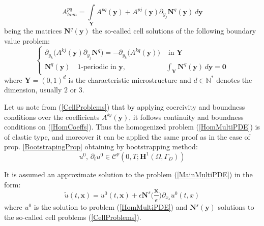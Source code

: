 \begin{equation}
    \label{HomCoeffs}
    A^{pq}_{hom} = \int \limits_{\mathbf{Y}} A^{pq}(\mathbf{y}) + A^{pj} (\mathbf{y}) \partial_{y_j} \mathbf{N}^q (\mathbf{y}) \, d\mathbf{y}
\end{equation}
being the matrices $\mathbf{N}^q(\mathbf{y})$ the so-called cell solutions of the following boundary value problem:
\begin{equation}
    \label{CellProblems}
    \left \{
    \begin{array}{cc}
        \partial_{y_k} \big( A^{kj}(\mathbf{y}) \partial_{y_j} \mathbf{N}^q \big) = -\partial_{y_k} \big( A^{kq}(\mathbf{y}) \big) & \text{ in } \mathbf{Y} \\
        \mathbf{N}^q(\mathbf{y}) \quad 1\text{-periodic in } \mathbf{y}, & \int_{\mathbf{Y}}  \mathbf{N}^q (\mathbf{y}) \, d\mathbf{y} = \mathbf{0}
    \end{array}
    \right .
\end{equation}
where $\mathbf{Y} = (0,1)^d$ is the characteristic microstructure and $d \in \mathbb{N}^*$ denotes the dimension, usually $2$ or $3$.\\

\begin{rem}
 Let us note from (\ref{CellProblems}) that by applying  coercivity and boundness conditions over the coefficients $A^{kj}(\mathbf{y})$, it follows continuity and boundness conditions on (\ref{HomCoeffs}). Thus the homogenized problem (\ref{HomMultiPDE}) is of elastic type, and moreover it can be applied the same proof as in the case of prop. \ref{BootstrapingProp} obtaining by bootstrapping method:
 \begin{equation*}
     u^0, \, \partial_{t} u^0 \in \mathcal{C}^p (0,T; \mathbf{H}^1(\Omega, \Gamma_D))
 \end{equation*}
\end{rem}

It is assumed an approximate solution to the problem (\ref{MainMultiPDE}) in the form:
\begin{equation}
    \label{Asymptotic}
    \tilde{u}(t,\mathbf{x}) = u^0 (t,\mathbf{x}) + \epsilon \mathbf{N}^{s} \big(\frac{\mathbf{x}}{\epsilon} \big) \partial_{x_s} u^0(t,x)
\end{equation}
where $u^0$ is the solution to problem (\ref{HomMultiPDE}) and $\mathbf{N}^{s} (\mathbf{y})$ solutions to the so-called cell problems (\ref{CellProblems}).


